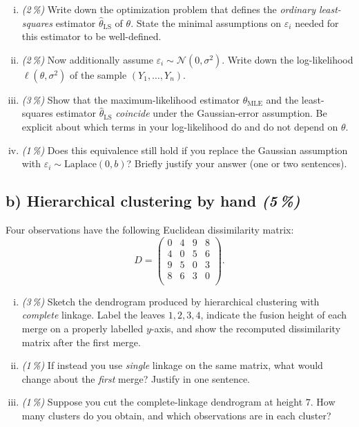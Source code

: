 \documentclass[11pt,a4paper]{article}
\newcommand{\subpoints}[1]{\textit{(#1\,\%)}}
\begin{document}
\begin{enumerate}[(i)]
  \item \subpoints{2} Write down the optimization problem that defines the \emph{ordinary least-squares} estimator $\hat\theta_{\mathrm{LS}}$ of $\theta$. State the minimal assumptions on $\varepsilon_i$ needed for this estimator to be well-defined.
  \item \subpoints{2} Now additionally assume $\varepsilon_i \sim \mathcal{N}(0, \sigma^2)$. Write down the log-likelihood $\ell(\theta, \sigma^2)$ of the sample $(Y_1,\dots,Y_n)$.
  \item \subpoints{3} Show that the maximum-likelihood estimator $\hat\theta_{\mathrm{MLE}}$ and the least-squares estimator $\hat\theta_{\mathrm{LS}}$ \emph{coincide} under the Gaussian-error assumption. Be explicit about which terms in your log-likelihood do and do not depend on $\theta$.
  \item \subpoints{1} Does this equivalence still hold if you replace the Gaussian assumption with $\varepsilon_i \sim \mathrm{Laplace}(0, b)$? Briefly justify your answer (one or two sentences).
\end{enumerate}

\subsection*{b) Hierarchical clustering by hand \subpoints{5}}

Four observations have the following Euclidean dissimilarity matrix:
$$D = \begin{pmatrix}
0 & 4 & 9 & 8 \\
4 & 0 & 5 & 6 \\
9 & 5 & 0 & 3 \\
8 & 6 & 3 & 0 \\
\end{pmatrix}.$$

\begin{enumerate}[(i)]
  \item \subpoints{3} Sketch the dendrogram produced by hierarchical clustering with \emph{complete} linkage. Label the leaves $1, 2, 3, 4$, indicate the fusion height of each merge on a properly labelled $y$-axis, and show the recomputed dissimilarity matrix after the first merge.
  \item \subpoints{1} If instead you use \emph{single} linkage on the same matrix, what would change about the \emph{first} merge? Justify in one sentence.
  \item \subpoints{1} Suppose you cut the complete-linkage dendrogram at height $7$. How many clusters do you obtain, and which observations are in each cluster?
\end{enumerate}
\end{document}
